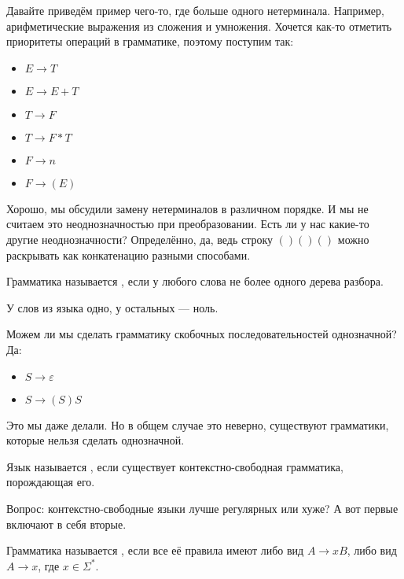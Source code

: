 \documentclass{article}
\begin{document}
\begin{itemize}
\begin{Example}
            Давайте приведём пример чего-то, где больше одного нетерминала. Например, арифметические выражения из сложения и умножения. Хочется как-то отметить приоритеты операций в грамматике, поэтому поступим так:
            \begin{itemize}
                \item $E\to T$
                \item $E\to E+T$
                \item $T\to F$
                \item $T\to F*T$
                \item $F\to n$
                \item $F\to (E)$
            \end{itemize}
        \end{Example}
        \begin{Comment}
            Хорошо, мы обсудили замену нетерминалов в различном порядке. И мы не считаем это неоднозначностью при преобразовании. Есть ли у нас какие-то другие неоднозначности? Определённо, да, ведь строку $()()()$ можно раскрывать как конкатенацию разными способами.
        \end{Comment}
        \dfn Грамматика называется , если у любого слова не более одного дерева разбора.
        \begin{Comment}
            У слов из языка одно, у остальных --- ноль.
        \end{Comment}
        \begin{Comment}
            Можем ли мы сделать грамматику скобочных последовательностей однозначной? Да:
            \begin{itemize}
                \item $S\to\varepsilon$
                \item $S\to(S)S$
            \end{itemize}
            Это мы даже делали. Но в общем случае это неверно, существуют грамматики, которые нельзя сделать однозначной.
        \end{Comment}
        \dfn Язык называется , если существует контекстно-свободная грамматика, порождающая его.
        \begin{Comment}
            Вопрос: контекстно-свободные языки лучше регулярных или хуже? А вот первые включают в себя вторые.
        \end{Comment}
        \dfn Грамматика называется , если все её правила имеют либо вид $A\to xB$, либо вид $A\to x$, где $x\in\Sigma^*$.

\end{itemize}
\end{document}
